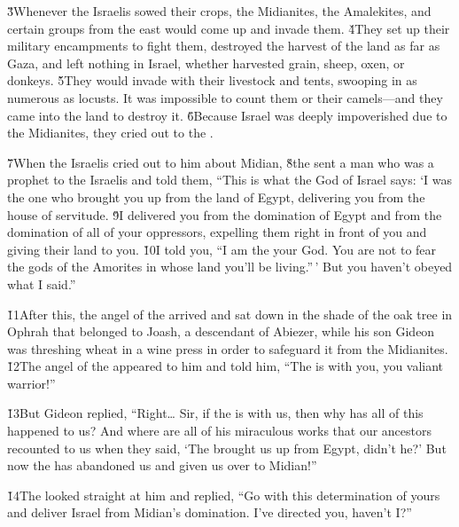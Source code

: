 \v{3}Whenever the Israelis sowed their crops, the Midianites, the Amalekites, and certain groups from the east would come up and invade them. \v{4}They set up their military encampments to fight them, destroyed the harvest of the land as far as Gaza, and left nothing in Israel, whether harvested grain, sheep, oxen, or donkeys. \v{5}They would invade with their livestock and tents, swooping in as numerous as locusts. It was impossible to count them or their camels---and they came into the land to destroy it. \v{6}Because Israel was deeply impoverished due to the Midianites, they cried out to the .

\v{7}When the Israelis cried out to him about Midian, \v{8}the  sent a man who was a prophet to the Israelis and told them, ``This is what the  God of Israel says: `I was the one who brought you up from the land of Egypt, delivering you from the house of servitude. \v{9}I delivered you from the domination of Egypt and from the domination of all of your oppressors, expelling them right in front of you and giving their land to you. \v{10}I told you, ``I am the  your God. You are not to fear the gods of the Amorites in whose land you'll be living.''\,' But you haven't obeyed what I said.''

\v{11}After this, the angel of the  arrived and sat down in the shade of the oak tree in Ophrah that belonged to Joash, a descendant of Abiezer, while his son Gideon was threshing wheat in a wine press in order to safeguard it from the Midianites. \v{12}The angel of the  appeared to him and told him, ``The  is with you, you valiant warrior!''

\v{13}But Gideon replied, ``Right{\ldots} Sir, if the  is with us, then why has all of this happened to us? And where are all of his miraculous works that our ancestors recounted to us when they said, `The  brought us up from Egypt, didn't he?' But now the  has abandoned us and given us over to Midian!''

\v{14}The  looked straight at him and replied, ``Go with this determination of yours and deliver Israel from Midian's domination. I've directed you, haven't I?''


